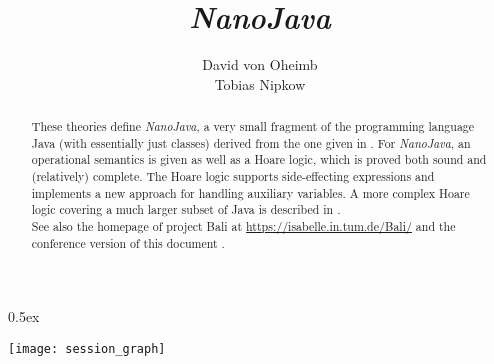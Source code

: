 \documentclass[11pt,a4paper]{article}
\newcommand{\nJava}{\it NanoJava}
\begin{document}
\title{\nJava}
\author{David von Oheimb \\ Tobias Nipkow}
\maketitle

\begin{abstract}\noindent
  These theories define {\nJava}, a very small fragment of the programming 
  language Java (with essentially just classes) derived from the one given 
  in \cite{NipkowOP00}.
  For {\nJava}, an operational semantics is given as well as a Hoare logic,
  which is proved both sound and (relatively) complete. 
  The Hoare logic supports side-effecting expressions and
  implements a new approach for handling auxiliary variables.
  A more complex Hoare logic covering a much larger subset of Java is described
  in \cite{DvO-CPE01}.\\
See also the homepage of project Bali at \url{https://isabelle.in.tum.de/Bali/}
and the conference version of this document \cite{NanoJava}.
\end{abstract}

\tableofcontents
\parindent 0pt \parskip 0.5ex

\begin{center}
  \texttt{[image: session\_graph]}  
\end{center}

\newpage


\newpage
\nocite{*}


\end{document}
